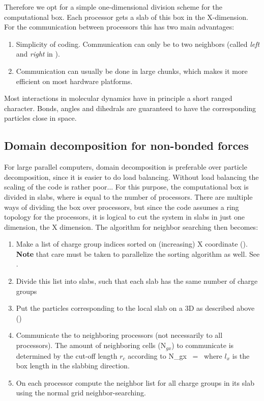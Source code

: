 Therefore we opt for a simple one-dimensional division scheme
for the computational box. Each processor gets a slab of this box in the 
X-dimension.
For the communication between processors this has two main advantages:
\begin{enumerate}
\item	Simplicity of coding. Communication can only be to two neighbors
	(called {\em left} and {\em right} in {\gromacs}).
\item	Communication can usually be done in large chunks, which makes it
	more efficient on most hardware platforms.
\end{enumerate}

Most interactions in molecular dynamics have in principle a short ranged character.
Bonds, angles and dihedrals are guaranteed to have the corresponding particles 
close in space.


\subsection{Domain decomposition for non-bonded forces}
For large parallel computers, domain decomposition is preferable over particle
decomposition, since it is easier to do load balancing. Without load balancing
the scaling of the code is rather poor...
For this purpose, the computational box is divided in {\nproc} slabs, where {\nproc}
is equal to the number of processors. There are multiple ways of dividing the box
over processors, but since the {\gromacs} code assumes
a ring topology for the processors, it is logical to cut the system in slabs in
just one dimension, the X dimension. 
The algorithm for neighbor searching then becomes:
\begin{enumerate}
\item	Make a list of charge group indices sorted on (increasing) X coordinate
	().
	{\bf Note} that care must be taken to parallelize the sorting algorithm
	as well. See .
\item	Divide this list into slabs, such that each slab has the same number of
	charge groups
\item	Put the particles corresponding to the local slab on a 3D {\nsgrid} as 
	described above ()
\item	Communicate the {\nsgrid} to neighboring processors (not necessarily to all
	processors). The amount of neighboring {\nsgrid} cells (N$_{gx}$) to 
	communicate is determined by the cut-off length $r_c$ according to
	\beq
	N_{gx}	~=~	   
	\eeq
	where $l_x$ is the box length in the slabbing direction. 
\item	On each processor compute the neighbor list for all charge groups in
	its slab using the normal grid neighbor-searching.
\end{enumerate}

